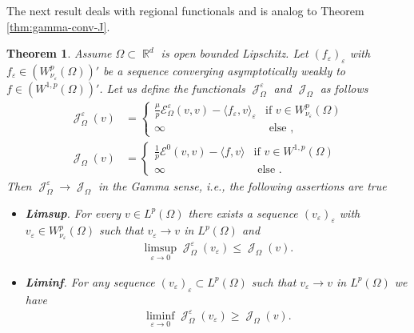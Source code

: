 \documentclass[12pt, reqno]{amsart}%
\theoremstyle{plain}  %
\newtheorem{theorem}{Theorem}[section]
\theoremstyle{definition}  %
\numberwithin{equation}{section}
\DeclareMathOperator{\cJ}{\mathcal{J}}
\DeclareMathOperator{\R}{\mathbb{R}}
\newcommand{\eps}{\varepsilon}
\newcommand{\WnuOma}{W^{p}_{\nu_\eps}(\Omega)}
\begin{document}
\noindent The next result deals with regional functionals and is analog to Theorem \ref{thm:gamma-conv-J}.
\begin{theorem}\label{thm:gamma-conv-JOm}
Assume $\Omega\subset \R^d$ is open bounded Lipschitz. Let $ (f_\eps)_\eps$ with  $f_\eps\in  (W^{p}_{\nu_\eps}(\Omega))'$ be a sequence  converging asymptotically weakly to  $f\in (W^{1,p}(\Omega))'$. Let us define the functionals $\cJ^\eps_\Omega$  and $\cJ_\Omega$ as follows
\begin{align*}
\cJ^\eps_\Omega (v)
&=\begin{cases}
\tfrac{\mu}{p} \mathcal{E}^\eps_\Omega(v,v)  -\langle f_\eps, v\rangle_\eps  & \text{if $v\in \WnuOma$}\\
\infty &\text{ else },
\end{cases}\\
\cJ_\Omega(v) &=\begin{cases}
\tfrac{1}{p} \mathcal{E}^0(v,v)  -\langle f, v\rangle& \text{if $v\in W^{1,p}(\Omega)$}\\
\infty &\text{ else }.
\end{cases}
\end{align*}
Then $\cJ^\eps_\Omega\to\cJ_\Omega$ in the Gamma sense, i.e., the following assertions are true
\begin{itemize}
\item \textbf{Limsup}.  For every  $v\in L^p(\Omega)$ there exists a sequence $(v_\eps)_\eps$ with  $v_\eps\in \WnuOma$ such that  $v_\eps\to v$ in $L^p(\Omega)$  and
\begin{align*}
\limsup_{\eps\to0} \cJ^\eps_\Omega (v_\eps)\leq \cJ_\Omega(v).
\end{align*}
\item \textbf{Liminf}. For any sequence $(v_\eps)_\eps\subset L^p(\Omega)$ such that $v_\eps\to v$ in $L^p(\Omega)$ we have
\begin{align*}
\liminf_{\eps\to0} \cJ^\eps_\Omega(v_\eps)\geq \cJ_\Omega(v).
\end{align*}
\end{itemize}
\end{theorem}

\end{document}
